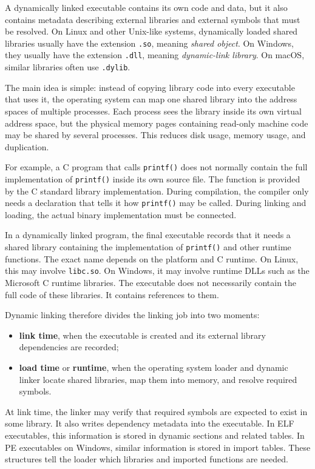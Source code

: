 A dynamically linked executable contains its own code and data, but it also contains metadata describing external libraries and external symbols that must be resolved. On Linux and other Unix-like systems, dynamically loaded shared libraries usually have the extension \texttt{.so}, meaning \emph{shared object}. On Windows, they usually have the extension \texttt{.dll}, meaning \emph{dynamic-link library}. On macOS, similar libraries often use \texttt{.dylib}.

The main idea is simple: instead of copying library code into every executable that uses it, the operating system can map one shared library into the address spaces of multiple processes. Each process sees the library inside its own virtual address space, but the physical memory pages containing read-only machine code may be shared by several processes. This reduces disk usage, memory usage, and duplication.

For example, a C program that calls \texttt{printf()} does not normally contain the full implementation of \texttt{printf()} inside its own source file. The function is provided by the C standard library implementation. During compilation, the compiler only needs a declaration that tells it how \texttt{printf()} may be called. During linking and loading, the actual binary implementation must be connected.

In a dynamically linked program, the final executable records that it needs a shared library containing the implementation of \texttt{printf()} and other runtime functions. The exact name depends on the platform and C runtime. On Linux, this may involve \texttt{libc.so}. On Windows, it may involve runtime DLLs such as the Microsoft C runtime libraries. The executable does not necessarily contain the full code of these libraries. It contains references to them.

Dynamic linking therefore divides the linking job into two moments:

\begin{itemize}
    \item \textbf{link time}, when the executable is created and its external library dependencies are recorded;
    \item \textbf{load time} or \textbf{runtime}, when the operating system loader and dynamic linker locate shared libraries, map them into memory, and resolve required symbols.
\end{itemize}

At link time, the linker may verify that required symbols are expected to exist in some library. It also writes dependency metadata into the executable. In ELF executables, this information is stored in dynamic sections and related tables. In PE executables on Windows, similar information is stored in import tables. These structures tell the loader which libraries and imported functions are needed.

